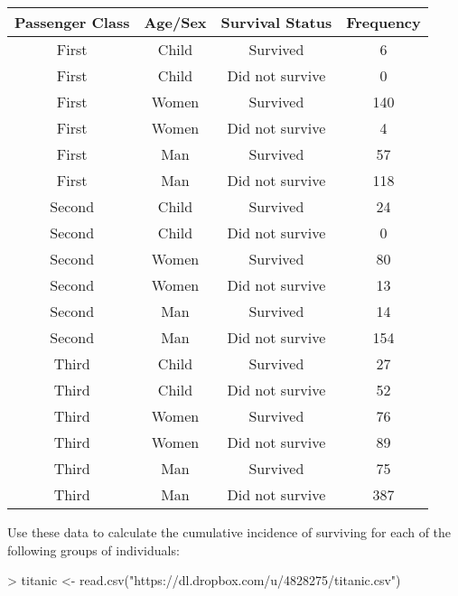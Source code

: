 \documentclass{article}
\begin{document}
\begin{table}[ht]
\begin{center}
\begin{tabular}{cccc}
  \hline
 Passenger Class & Age/Sex & Survival Status & Frequency \\ 
  \hline
First & Child & Survived &   6 \\ 
First & Child & Did not survive &   0 \\ 
First & Women & Survived & 140 \\ 
First & Women & Did not survive &   4 \\ 
First & Man & Survived &  57 \\ 
First & Man & Did not survive & 118 \\ 
Second & Child & Survived &  24 \\ 
Second & Child & Did not survive &   0 \\ 
Second & Women & Survived &  80 \\ 
Second & Women & Did not survive &  13 \\ 
Second & Man & Survived &  14 \\ 
Second & Man & Did not survive & 154 \\ 
Third & Child & Survived &  27 \\ 
Third & Child & Did not survive &  52 \\ 
Third & Women & Survived &  76 \\ 
Third & Women & Did not survive &  89 \\ 
Third & Man & Survived &  75 \\ 
Third & Man & Did not survive & 387 \\ 
   \hline
\end{tabular}
\end{center}
\end{table}

Use these data to calculate the cumulative incidence of surviving for each of the following groups of individuals:

\begin{Schunk}
\begin{Sinput}
> titanic <- read.csv("https://dl.dropbox.com/u/4828275/titanic.csv")
\end{Sinput}
\end{Schunk}
\end{document}
